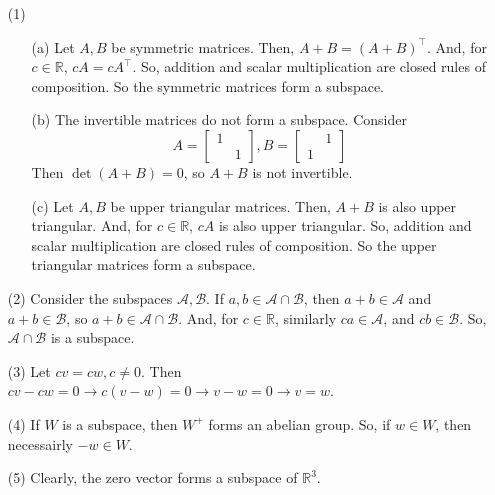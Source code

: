 %
%
\begin{itemize}
\item[(1)]
\begin{itemize}
\item[(a)]
Let $A, B$ be symmetric matrices. Then, $A + B = (A + B)^\top$. And, for $c \in \mathbb{R}$, $cA = cA^\top$. So, addition and scalar multiplication are closed rules of composition. So the symmetric matrices form a subspace.
\item[(b)]
The invertible matrices do not form a subspace. Consider
$$A = \begin{bmatrix}
1 \\
& 1
\end{bmatrix}, B = \begin{bmatrix}
& 1 \\
1
\end{bmatrix}$$
Then $\det(A + B) = 0$, so $A + B$ is not invertible.
\item[(c)]
Let $A, B$ be upper triangular matrices. Then, $A + B$ is also upper triangular. And, for $c \in \mathbb{R}$, $cA$ is also upper triangular. So, addition and scalar multiplication are closed rules of composition. So the upper triangular matrices form a subspace.
\end{itemize}
\item[(2)]
Consider the subspaces $\mathcal{A}, \mathcal{B}$. If $a, b \in \mathcal{A} \cap \mathcal{B}$, then $a + b \in \mathcal{A}$ and $a + b \in \mathcal{B}$, so $a + b \in \mathcal{A} \cap \mathcal{B}$. And, for $c \in \mathbb{R}$, similarly $ca \in \mathcal{A}$, and $cb \in \mathcal{B}$. So, $\mathcal{A} \cap \mathcal{B}$ is a subspace.
\item[(3)]
Let $cv = cw, c \neq 0$. Then $cv - cw = 0 \rightarrow c(v - w) = 0 \rightarrow v - w = 0 \rightarrow v = w$.
\item[(4)]
If $W$ is a subspace, then $W^+$ forms an abelian group. So, if $w \in W$, then necessairly $-w \in W$.
\item[(5)]
Clearly, the zero vector forms a subspace of $\mathbb{R}^3$.


\end{itemize}
